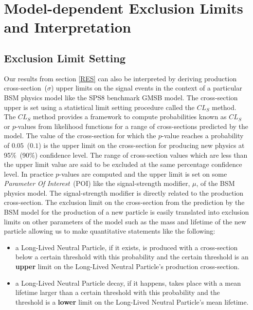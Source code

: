 \chapter{Model-dependent Exclusion Limits and Interpretation}
\label{Limit_Setting_and_Interpretation_Chapter}

\section{Exclusion Limit Setting}
Our results from section \ref{RES} can also be interpreted by deriving production cross-section~($\sigma$) upper limits on the  signal events in the context of a particular BSM physics model like the SPS8 benchmark GMSB model. The cross-section upper is set using a statistical limit setting procedure called the $CL_{S}$ method. The $CL_{S}$ method provides a framework to compute probabilities known as $CL_{S}$ or $p$-values from likelihood functions for a range of cross-sections predicted by the model. The value of the cross-section for which the $p$-value reaches a probability of $0.05$~($0.1$) is the upper limit on the cross-section for producing new physics at 95\%~(90\%) confidence level. The range of cross-section values  which are less than the upper limit value are said to be excluded at the same percentage  confidence level. In practice $p$-values are computed and the upper limit is set on some \textit{Parameter Of Interest}~(POI) like the signal-strength modifier, $\mu$, of the BSM physics model. The signal-strength modifier is directly related to the production cross-section.
\newline 
The exclusion limit on the cross-section from the prediction by the BSM model for the production of a new particle is easily translated into exclusion limits on other parameters of the model such as the mass and lifetime of the new particle allowing us to make quantitative statements like the following: 
\begin{itemize}
\item a Long-Lived Neutral Particle, if it exists, is produced with a cross-section below a certain threshold with this probability and the certain threshold is an \textbf{upper} limit on the Long-Lived Neutral Particle's production cross-section.
\item a Long-Lived Neutral Particle decay, if it happens, takes place with a mean lifetime larger than a certain threshold with this probability and the threshold is a \textbf{lower} limit on the Long-Lived Neutral Particle's mean lifetime.
\end{itemize}
